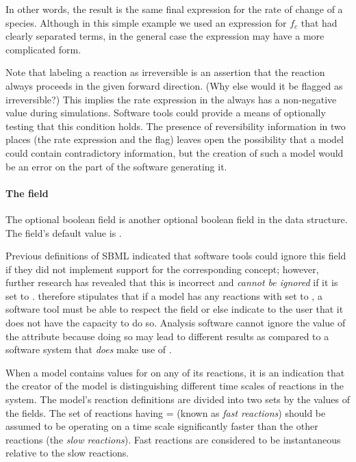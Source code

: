 In other words, the result is the same final expression for the
rate of change of a species.  Although in this simple example we
used an expression for $f_c$ that had clearly separated terms, in
the general case the expression may have a more complicated form.

Note that labeling a reaction as irreversible is an assertion that
the reaction always proceeds in the given forward direction.  (Why
else would it be flagged as irreversible?)  This implies the rate
expression in the \KineticLaw always has a non-negative value
during simulations.  Software tools could provide a means of
optionally testing that this condition holds.  The presence of
reversibility information in two places (\ie the rate expression
and the  flag) leaves open the possibility that
a model could contain contradictory information, but the creation
of such a model would be an error on the part of the software
generating it.


\paragraph{The  field}
\label{sec:fast}

The optional boolean field  is another optional
boolean field in the \Reaction data structure.  The field's
default value is .

Previous definitions of SBML indicated that software tools could
ignore this field if they did not implement support for the
corresponding concept; however, further research has revealed that
this is incorrect and  \emph{cannot be ignored} if it
is set to .  \sbmltwotwo therefore stipulates that if a
model has any reactions with  set to , a
software tool must be able to respect the field or else indicate
to the user that it does not have the capacity to do so.  Analysis
software cannot ignore the value of the  attribute
because doing so may lead to different results as compared to a
software system that \emph{does} make use of .

When a model contains values for  on any of its
reactions, it is an indication that the creator of the model is
distinguishing different time scales of reactions in the system.
The model's reaction definitions are divided into two sets by the
values of the  fields.  The set of reactions having
= (known as \emph{fast reactions}) should be
assumed to be operating on a time scale significantly faster than
the other reactions (the \emph{slow reactions}).  Fast reactions
are considered to be instantaneous relative to the slow reactions.

